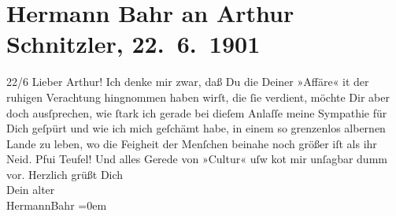 

               \section[Hermann Bahr an Arthur Schnitzler, 22. 6. 1901]{ Hermann Bahr an Arthur Schnitzler, 22. 6. 1901}\nopagebreak{}\rehead{ }\begin{ledgroupsized}[t]{13cm}\normalsize\beginnumbering{} \toendnotes[C]{\smallbreak\pagebreak[2]} 
\toendnotes[C]{\smallbreak}\pstart
           \raggedleft{}{\pb}22/6\pend
           \pstart\center{}Lieber Arthur!\pend\pstart
           Ich denke mir zwar, daß Du die \label{K_L01131_1v}\label{K_L01131_1h} Deiner
               »Affäre« it der ruhigen Verachtung hingnommen haben wirſt, die ſie verdient, möchte Dir aber doch ausſprechen, wie
               ſtark ich gerade bei dieſem Anlaſſe meine Sympathie für {\pb}Dich geſpürt und wie ich mich geſchämt habe, in
               einem so grenzenlos albernen Lande zu leben, wo die Feigheit der Menſchen beinahe
               noch größer iſt als ihr Neid. Pfui Teufel! Und alles Gerede von »Cultur« uſw ko{\geminationm}t mir unſagbar dumm vor.\pend
           \pstart
           Herzlich grüßt Dich{\\[\baselineskip]}Dein alter{\\[\baselineskip]}\spacefill\mbox{HermannBahr}\pend
           \leftskip=0em{}\endnumbering{}\end{ledgroupsized}  \newcommand{\dateiname}{L01131}\newcommand{\titel}{Hermann Bahr an Arthur Schnitzler, 22. 6. 1901}\newcommand{\editorInnen}{ Kurt Ifkovits,  Martin Anton Müller}
            \footnotesize
\begin{ledgroupsized}[t]{11.5cm}
\end{ledgroupsized}
         
      